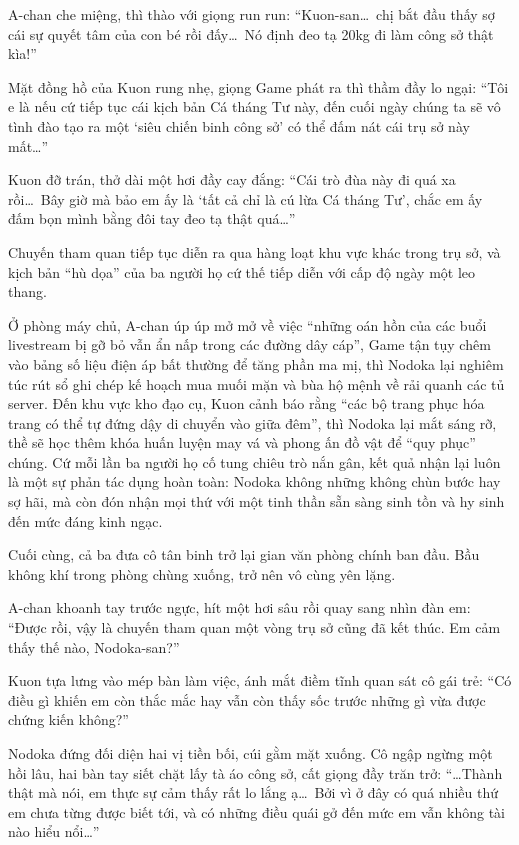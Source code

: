 \documentclass[../main.tex]{subfiles}
\begin{document}
A-chan che miệng, thì thào với giọng run run: ``Kuon-san\dots\ chị bắt đầu thấy sợ cái sự quyết tâm của con bé rồi đấy\dots\ Nó định đeo tạ 20kg đi làm công sở thật kìa!''

Mặt đồng hồ của Kuon rung nhẹ, giọng Game phát ra thì thầm đầy lo ngại: ``Tôi e là nếu cứ tiếp tục cái kịch bản Cá tháng Tư này, đến cuối ngày chúng ta sẽ vô tình đào tạo ra một `siêu chiến binh công sở' có thể đấm nát cái trụ sở này mất\dots''

Kuon đỡ trán, thở dài một hơi đầy cay đắng: ``Cái trò đùa này đi quá xa rồi\dots\ Bây giờ mà bảo em ấy là `tất cả chỉ là cú lừa Cá tháng Tư', chắc em ấy đấm bọn mình bằng đôi tay đeo tạ thật quá\dots''

\ct

Chuyến tham quan tiếp tục diễn ra qua hàng loạt khu vực khác trong trụ sở, và kịch bản ``hù dọa'' của ba người họ cứ thế tiếp diễn với cấp độ ngày một leo thang.

Ở phòng máy chủ, A-chan úp úp mở mở về việc ``những oán hồn của các buổi livestream bị gỡ bỏ vẫn ẩn nấp trong các đường dây cáp'', Game tận tụy chêm vào bảng số liệu điện áp bất thường để tăng phần ma mị, thì Nodoka lại nghiêm túc rút sổ ghi chép kế hoạch mua muối mặn và bùa hộ mệnh về rải quanh các tủ server. Đến khu vực kho đạo cụ, Kuon cảnh báo rằng ``các bộ trang phục hóa trang có thể tự đứng dậy di chuyển vào giữa đêm'', thì Nodoka lại mắt sáng rỡ, thề sẽ học thêm khóa huấn luyện may vá và phong ấn đồ vật để ``quy phục'' chúng. Cứ mỗi lần ba người họ cố tung chiêu trò nắn gân, kết quả nhận lại luôn là một sự phản tác dụng hoàn toàn: Nodoka không những không chùn bước hay sợ hãi, mà còn đón nhận mọi thứ với một tinh thần sẵn sàng sinh tồn và hy sinh đến mức đáng kinh ngạc.

Cuối cùng, cả ba đưa cô tân binh trở lại gian văn phòng chính ban đầu. Bầu không khí trong phòng chùng xuống, trở nên vô cùng yên lặng.

A-chan khoanh tay trước ngực, hít một hơi sâu rồi quay sang nhìn đàn em: ``Được rồi, vậy là chuyến tham quan một vòng trụ sở cũng đã kết thúc. Em cảm thấy thế nào, Nodoka-san?''

Kuon tựa lưng vào mép bàn làm việc, ánh mắt điềm tĩnh quan sát cô gái trẻ: ``Có điều gì khiến em còn thắc mắc hay vẫn còn thấy sốc trước những gì vừa được chứng kiến không?''

Nodoka đứng đối diện hai vị tiền bối, cúi gằm mặt xuống. Cô ngập ngừng một hồi lâu, hai bàn tay siết chặt lấy tà áo công sở, cất giọng đầy trăn trở: ``\dots Thành thật mà nói, em thực sự cảm thấy rất lo lắng ạ\dots\ Bởi vì ở đây có quá nhiều thứ em chưa từng được biết tới, và có những điều quái gở đến mức em vẫn không tài nào hiểu nổi\dots''
\end{document}
